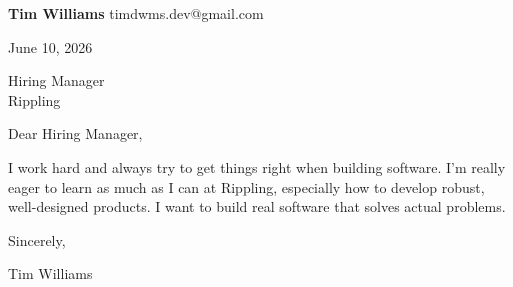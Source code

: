 \documentclass[12pt]{article}
\begin{document}
\textbf{Tim Williams} \hfill timdwms.dev@gmail.com

\vspace{1em}

June 10, 2026

\vspace{1em}

Hiring Manager \\
Rippling

\vspace{1em}

Dear Hiring Manager,

I work hard and always try to get things right when building software. I'm really eager to learn as much as I can at Rippling, especially how to develop robust, well-designed products. I want to build real software that solves actual problems.

\vspace{1em}

Sincerely,

\vspace{2em}

Tim Williams
\end{document}
